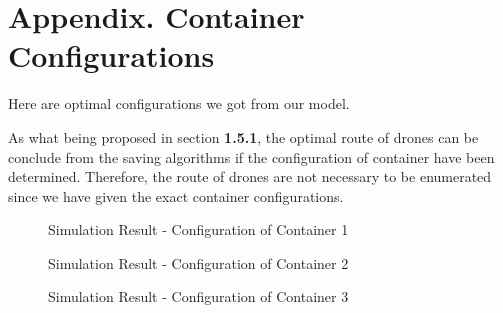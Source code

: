 \documentclass[12pt]{article}
\begin{document}
	\section{Appendix. Container Configurations}	
	Here are optimal configurations we got from our model. \par 
	As what being proposed in section \textbf{1.5.1}, the optimal route of drones can be conclude from the saving algorithms if the configuration of container have been determined. Therefore, the route of drones are not necessary to be enumerated since we have given the exact container configurations. 
	\begin{figure}[H]
		\centering
		\caption{Simulation Result - Configuration of Container 1}
	\end{figure}
	
	
	\begin{figure}[H]
		\centering
		\caption{Simulation Result - Configuration of Container 2}
	\end{figure}
	
	
	\begin{figure}[H]
		\centering
		\caption{Simulation Result - Configuration of Container 3}
	\end{figure}
	
\end{document}
